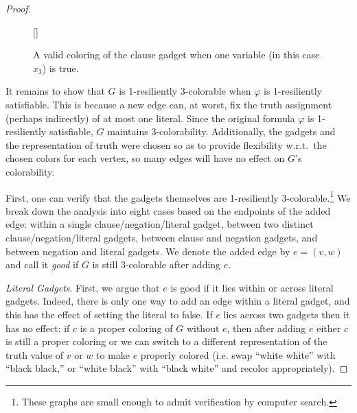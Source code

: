 \begin{proof}
\begin{figure}
[\FBwidth]
{\caption{A valid coloring of the clause gadget when one variable (in this case
$x_3$) is true.}\label{fig:clause-gadget-proof}}
{}
\end{figure}

It remains to show that $G$ is 1-resiliently 3-colorable when $\varphi$ is
1-resiliently satisfiable. This is because a new edge can, at worst, fix the
truth assignment (perhaps indirectly) of at most one literal. Since the
original formula $\varphi$ is 1-resiliently satisfiable, $G$ maintains
3-colorability.  Additionally, the gadgets and the representation of truth were
chosen so as to provide flexibility w.r.t.\ the chosen colors for each vertex,
so many edges will have no effect on $G$'s colorability. 

First, one can verify that the gadgets themselves are 1-resiliently
3-colorable.\footnote{These graphs are small enough to admit verification by
computer search.} We break down the analysis into eight cases based on the
endpoints of the added edge: within a single clause/negation/literal gadget,
between two distinct clause/negation/literal gadgets, between clause and
negation gadgets, and between negation and literal gadgets. We denote the added
edge by $e = (v,w)$ and call it \emph{good} if $G$ is still 3-colorable after
adding $e$. 

\emph{Literal Gadgets}. First, we argue that $e$ is good if it lies within or
across literal gadgets. Indeed, there is only one way to add an edge within a
literal gadget, and this has the effect of setting the literal to false. If $e$
lies across two gadgets then it has no effect: if $c$ is a proper coloring of
$G$ without $e$, then after adding $e$ either $c$ is still a proper coloring or
we can switch to a different representation of the truth value of $v$ or $w$ to
make $e$ properly colored (i.e. swap ``white white'' with ``black black,'' or
``white black'' with ``black white'' and recolor appropriately). 


\end{proof}
